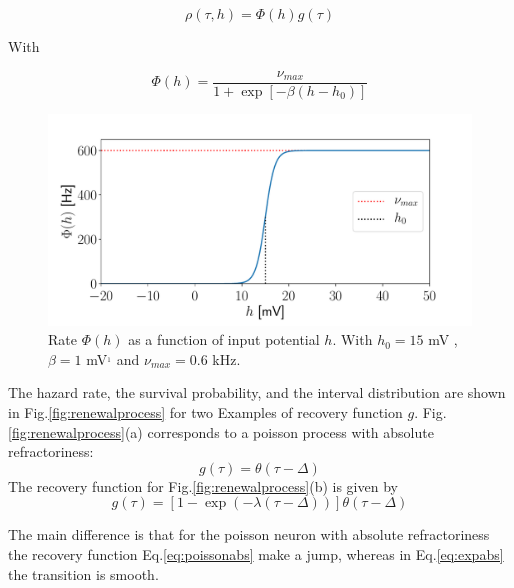 \documentclass[a4paper,11pt,twoside]{article}
\numberwithin{equation}{section}
\begin{document}
\begin{equation}
\label{eq:rho}
\rho(\tau,h)=\Phi(h)g(\tau)
\end{equation}

With 

\begin{equation}
\label{eq:phi}
\Phi(h)=\frac{\nu_{max}}{1+\exp[-\beta(h-h_0)]}
\end{equation}

\begin{figure}[h!]
	\centering
	\includegraphics[width=0.8\linewidth]{phi_h.pdf}
	\caption{ Rate $\Phi(h)$ as a function of input potential $h$. With $h_0=15$ mV , $\beta=1$ mV$^{_1}$ and $\nu_{max}=0.6$ kHz.}
	\label{fig:phi_h}
\end{figure}

The hazard rate, the survival probability, and the interval distribution are shown in Fig.\ref{fig:renewalprocess} for two Examples of recovery function $g$. Fig.\ref{fig:renewalprocess}(a) corresponds to a poisson process with absolute refractoriness: 
\begin{equation}
\label{eq:poissonabs}
g(\tau)=\theta(\tau-\Delta)
\end{equation}
The recovery function for Fig.\ref{fig:renewalprocess}(b) is given by
\begin{equation}
\label{eq:expabs}
g(\tau)=\left[1-\exp(-\lambda(\tau-\Delta))\right]\theta(\tau-\Delta)
\end{equation}

The main difference is that for the poisson neuron with absolute refractoriness the recovery function Eq.\eqref{eq:poissonabs} make a jump, whereas in Eq.\eqref{eq:expabs} the transition is smooth.
\end{document}
